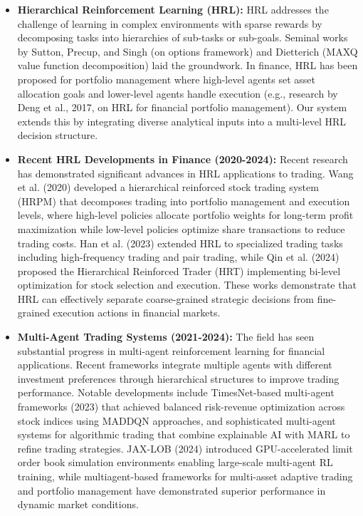 \documentclass[11pt,a4paper]{article}
\begin{document}
\begin{itemize}
\item   \textbf{Hierarchical Reinforcement Learning (HRL):} HRL addresses the challenge of learning in complex environments with sparse rewards by decomposing tasks into hierarchies of sub-tasks or sub-goals. Seminal works by Sutton, Precup, and Singh (on options framework) and Dietterich (MAXQ value function decomposition) laid the groundwork. In finance, HRL has been proposed for portfolio management where high-level agents set asset allocation goals and lower-level agents handle execution (e.g., research by Deng et al., 2017, on HRL for financial portfolio management). Our system extends this by integrating diverse analytical inputs into a multi-level HRL decision structure.

\item   \textbf{Recent HRL Developments in Finance (2020-2024):} Recent research has demonstrated significant advances in HRL applications to trading. Wang et al. (2020) developed a hierarchical reinforced stock trading system (HRPM) that decomposes trading into portfolio management and execution levels, where high-level policies allocate portfolio weights for long-term profit maximization while low-level policies optimize share transactions to reduce trading costs. Han et al. (2023) extended HRL to specialized trading tasks including high-frequency trading and pair trading, while Qin et al. (2024) proposed the Hierarchical Reinforced Trader (HRT) implementing bi-level optimization for stock selection and execution. These works demonstrate that HRL can effectively separate coarse-grained strategic decisions from fine-grained execution actions in financial markets.

\item   \textbf{Multi-Agent Trading Systems (2021-2024):} The field has seen substantial progress in multi-agent reinforcement learning for financial applications. Recent frameworks integrate multiple agents with different investment preferences through hierarchical structures to improve trading performance. Notable developments include TimesNet-based multi-agent frameworks (2023) that achieved balanced risk-revenue optimization across stock indices using MADDQN approaches, and sophisticated multi-agent systems for algorithmic trading that combine explainable AI with MARL to refine trading strategies. JAX-LOB (2024) introduced GPU-accelerated limit order book simulation environments enabling large-scale multi-agent RL training, while multiagent-based frameworks for multi-asset adaptive trading and portfolio management have demonstrated superior performance in dynamic market conditions.


\end{itemize}
\end{document}
